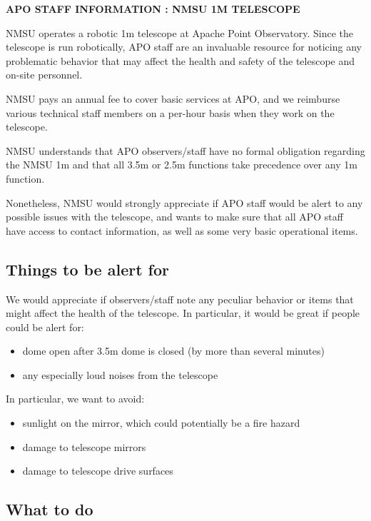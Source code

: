 \documentclass{article}
\begin{document}
\setcounter{section}{1}
\setcounter{subsection}{0}
\begin{center}
\textbf{\large APO STAFF INFORMATION  :  NMSU 1M TELESCOPE}
\end{center}
\vskip 0.25in

NMSU operates a robotic 1m telescope at Apache Point Observatory.
Since the telescope is run robotically, APO staff are an 
invaluable resource for noticing any problematic behavior
that may affect the health and safety of the telescope and
on-site personnel. 

NMSU pays an annual fee to cover basic services at APO, and
we reimburse various technical staff members on a per-hour
basis when they work on the telescope.

NMSU understands that APO observers/staff have no formal obligation
regarding the NMSU 1m and that all 3.5m or 2.5m functions take
precedence over any 1m function.

Nonetheless, NMSU would strongly appreciate if APO staff would
be alert to any possible issues with the telescope, and wants
to make sure that all APO staff have access to contact information,
as well as some very basic operational items.

\subsection{Things to be alert for}

We would appreciate if observers/staff note any peculiar
behavior or items that might affect the health of the telescope. 
In particular, it would be great if people could be alert for:
\begin{itemize}
\item dome open after 3.5m dome is closed (by more than several minutes)
\item any especially loud noises from the telescope
\end{itemize}

In particular, we want to avoid:

\begin{itemize}
\item sunlight on the mirror, which could potentially be a fire
hazard
\item damage to telescope mirrors
\item damage to telescope drive surfaces
\end{itemize}

\subsection{What to do}
\end{document}
